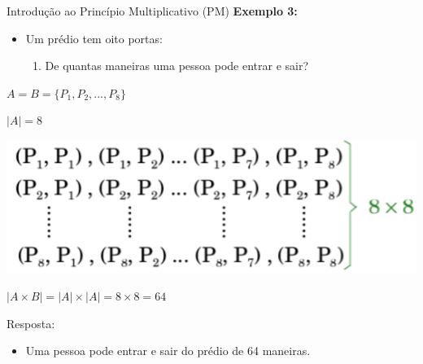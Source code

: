 \documentclass[aspectratio=169]{beamer}
\begin{document}
\begin{frame}{Introdução ao Princípio Multiplicativo (PM)}
    \textbf{Exemplo 3:}

    \vspace{2mm}
    \begin{itemize}
        \item Um prédio tem oito portas:
        \begin{enumerate}[a]
            \item De quantas maneiras uma pessoa pode entrar e sair?
        \end{enumerate}
    \end{itemize}

    \vspace{2mm}
       
    \begin{center}
        \begin{multicols}{2}
            $A = B = \{ P_1, P_2, ..., P_8 \}$
            
            \columnbreak
    
            $|A| = 8$    
        \end{multicols}
    \end{center}

    \begin{center}
        \includegraphics[width=0.5\linewidth]{figs/combinacoes_portas.png}
    \end{center}

    \begin{center}
        $|A \times B| = |A| \times |A| = 8 \times 8 = 64$
    \end{center}

    Resposta:

    \vspace{3mm}
    \begin{itemize}
        \item Uma pessoa pode entrar e sair do prédio de 64 maneiras.
    \end{itemize}

\end{frame}
\end{document}
